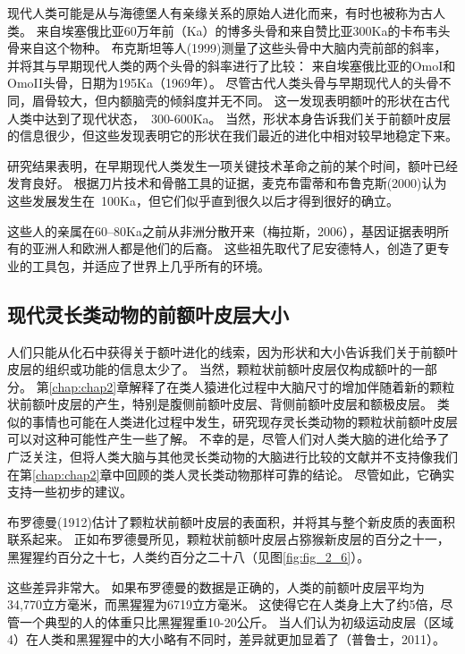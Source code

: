 现代人类可能是从与海德堡人有亲缘关系的原始人进化而来，有时也被称为古人类。
来自埃塞俄比亚60万年前（Ka）的博多头骨和来自赞比亚300Ka的卡布韦头骨来自这个物种。
布克斯坦等人(1999)测量了这些头骨中大脑内壳前部的斜率，并将其与早期现代人类的两个头骨的斜率进行了比较：
来自埃塞俄比亚的OmoI和OmoII头骨，日期为195Ka（1969年）。
尽管古代人类头骨与早期现代人的头骨不同，眉骨较大，但内额脑壳的倾斜度并无不同。
这一发现表明额叶的形状在古代人类中达到了现代状态，~300-600Ka。
当然，形状本身告诉我们关于前额叶皮层的信息很少，但这些发现表明它的形状在我们最近的进化中相对较早地稳定下来。
\par


研究结果表明，在早期现代人类发生一项关键技术革命之前的某个时间，额叶已经发育良好。
根据刀片技术和骨骼工具的证据，麦克布雷蒂和布鲁克斯(2000)认为这些发展发生在~100Ka，但它们似乎直到很久以后才得到很好的确立。
\par


这些人的亲属在60–80Ka之前从非洲分散开来（梅拉斯，2006），基因证据表明所有的亚洲人和欧洲人都是他们的后裔。
这些祖先取代了尼安德特人，创造了更专业的工具包，并适应了世界上几乎所有的环境。



\subsection{现代灵长类动物的前额叶皮层大小}

人们只能从化石中获得关于额叶进化的线索，因为形状和大小告诉我们关于前额叶皮层的组织或功能的信息太少了。
当然，颗粒状前额叶皮层仅构成额叶的一部分。
第\ref{chap:chap2}章解释了在类人猿进化过程中大脑尺寸的增加伴随着新的颗粒状前额叶皮层的产生，特别是腹侧前额叶皮层、背侧前额叶皮层和额极皮层。
类似的事情也可能在人类进化过程中发生，研究现存灵长类动物的颗粒状前额叶皮层可以对这种可能性产生一些了解。
不幸的是，尽管人们对人类大脑的进化给予了广泛关注，但将人类大脑与其他灵长类动物的大脑进行比较的文献并不支持像我们在第\ref{chap:chap2}章中回顾的类人灵长类动物那样可靠的结论。
尽管如此，它确实支持一些初步的建议。
\par


布罗德曼(1912)估计了颗粒状前额叶皮层的表面积，并将其与整个新皮质的表面积联系起来。
正如布罗德曼所见，颗粒状前额叶皮层占猕猴新皮层的百分之十一，黑猩猩约百分之十七，人类约百分之二十八（见图\ref{fig:fig_2_6}）。
\par


这些差异非常大。
如果布罗德曼的数据是正确的，人类的前额叶皮层平均为34,770立方毫米，而黑猩猩为6719立方毫米。
这使得它在人类身上大了约5倍，尽管一个典型的人的体重只比黑猩猩重10-20公斤。
当人们认为初级运动皮层（区域4）在人类和黑猩猩中的大小略有不同时，差异就更加显着了（普鲁士，2011）。
\par


